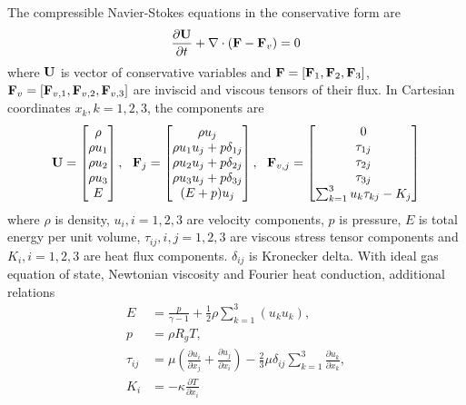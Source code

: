 The compressible Navier-Stokes equations in the conservative form are
\begin{equation}
    \label{eq:NS}
    \frac{\partial \mathbf{U}}{\partial t} +
    \mathbf\nabla \cdot (\mathbf{F} - \mathbf{F}_v)  = 0
\end{equation}
where $\mathbf{U}$ is vector of conservative variables and
$\mathbf{F}=[\mathbf{F}_1,\mathbf{F}_2,\mathbf{F}_3]$,
$\mathbf{F}_v=[\mathbf{F}_{v,1},\mathbf{F}_{v,2},\mathbf{F}_{v,3}]$
are
inviscid and viscous tensors of
their flux.
In Cartesian coordinates $x_k, k=1,2,3$, the components are
\begin{equation}
    \mathbf{U} = \begin{bmatrix}
        \rho \\ \rho u_1 \\ \rho u_2 \\ \rho u_3 \\ E
    \end{bmatrix},\ \
    \mathbf{F}_j = \begin{bmatrix}
        \rho u_j                   \\
        \rho u_1u_j + p\delta_{1j} \\
        \rho u_2u_j + p\delta_{2j} \\
        \rho u_3u_j + p\delta_{3j} \\
        (E+p)u_j                   \\
    \end{bmatrix},\ \
    \mathbf{F}_{v,j} = \begin{bmatrix}
        0                                \\
        \tau_{1j}                        \\
        \tau_{2j}                        \\
        \tau_{3j}                        \\
        \sum_{k=1}^3{u_k\tau_{kj}} - K_j \\
    \end{bmatrix}
\end{equation}
where $\rho$ is density,
$u_i, i=1,2,3$ are velocity components,
$p$ is pressure,
$E$ is total energy per unit volume,
$\tau_{ij}, i,j=1,2,3$ are viscous stress tensor components
and
$K_i, i=1,2,3$ are heat flux components.
$\delta_{ij}$ is
Kronecker delta.
With ideal gas equation of state,
Newtonian viscosity and Fourier
heat conduction, additional relations
\begin{equation}
    \begin{aligned}
        E         & = \frac{p}{\gamma -1 } + \frac{1}{2}\rho\sum_{k=1}^{3}(u_ku_k),  \\
        p         & =\rho R_g T                                              ,       \\
        \tau_{ij} & =
        \mu\left(\frac{\partial u_i}{\partial x_j} + \frac{\partial u_j}{\partial x_i}\right)
        -
        \frac{2}{3}\mu \delta_{ij}\sum_{k=1}^{3}{\frac{\partial u_k}{\partial x_k}}, \\
        K_i       & = - \kappa \frac{\partial T}{\partial x_i}
    \end{aligned}
\end{equation}
